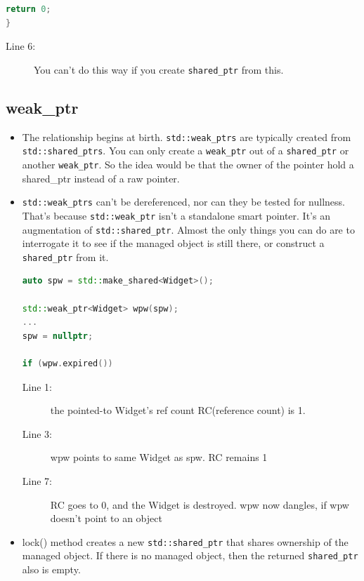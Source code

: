 \documentclass[a4paper,11pt,twoside]{book}
\begin{document}
\begin{itemize}
\begin{lstlisting}[frame=single, language=c++]
    return 0;
}
\end{lstlisting}
\begin{description}
	\item[Line 6:] You can't do this way if you create \texttt{shared\_ptr} from this.
\end{description}

\end{itemize}


\subsection{weak\_ptr}
\begin{itemize}

\item The relationship begins at birth. \texttt{std::weak\_ptrs} are typically created from \texttt{std::shared\_ptrs}. You can only create a \texttt{weak\_ptr} out of a \texttt{shared\_ptr} or another \texttt{weak\_ptr}. So the idea would be that the owner of the pointer hold a shared\_ptr instead of a raw pointer.


\item \texttt{std::weak\_ptrs} can't be dereferenced, nor can they be tested for nullness. That's because \texttt{std::weak\_ptr} isn't a standalone smart pointer. It's an augmentation of \texttt{std::shared\_ptr}. Almost the only things you can do are to interrogate it to see if the managed object is still there, or construct a \texttt{shared\_ptr} from it.

\begin{lstlisting}[frame=single, language=c++,mathescape=true]
auto spw = std::make_shared<Widget>();

std::weak_ptr<Widget> wpw(spw);
...
spw = nullptr;

if (wpw.expired())
\end{lstlisting}
\begin{description}
	\item[Line 1:] the pointed-to Widget's ref count RC(reference count) is 1.
	\item[Line 3:] wpw points to same Widget as spw. RC remains 1
	\item[Line 7:] RC goes to 0, and the Widget is destroyed. wpw now dangles, if wpw doesn't point to an object
\end{description}

\item lock() method creates a new \texttt{std::shared\_ptr} that shares ownership of the managed object. If there is no managed object, then the returned \texttt{shared\_ptr} also is empty.


\end{itemize}
\end{document}
